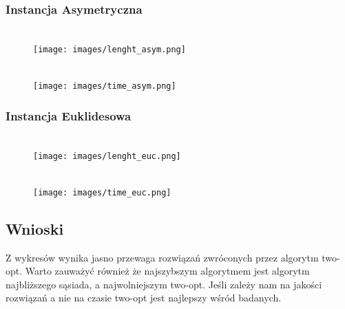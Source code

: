 \documentclass[11pt]{article}
\begin{document}
\subsubsection{Instancja Asymetryczna }
            \begin{center}
            \begin{figure}[H]

                \\ \texttt{[image: images/lenght\_asym.png]}\

            \end{figure}
            \end{center}
            \begin{center}
            \begin{figure}[H]

                \\ \texttt{[image: images/time\_asym.png]}\

            \end{figure}
            \end{center}
\subsubsection{Instancja Euklidesowa }
            \begin{center}
            \begin{figure}[H]

                \\ \texttt{[image: images/lenght\_euc.png]}\

            \end{figure}
            \end{center}
            \begin{center}
            \begin{figure}[H]

                \\ \texttt{[image: images/time\_euc.png]}\

            \end{figure}
            \end{center}
\subsection{Wnioski }   
Z wykresów wynika jasno przewaga rozwiązań zwróconych przez algorytm two-opt. Warto zauważyć również że najszybszym algorytmem jest algorytm najbliższego sąsiada, a najwolniejszym two-opt. Jeśli zależy nam na jakości rozwiązań a nie na czasie two-opt jest najlepszy wśród badanych. 
\end{document}
